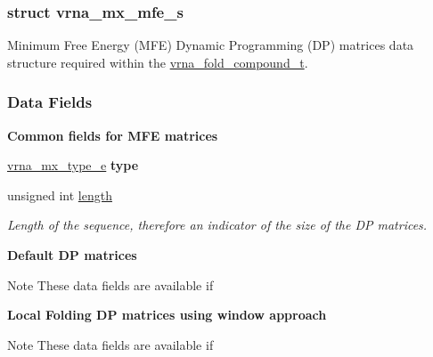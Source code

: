 \subsubsection{struct vrna\+\_\+mx\+\_\+mfe\+\_\+s}
Minimum Free Energy (M\+FE) Dynamic Programming (DP) matrices data structure required within the \mbox{\hyperlink{group__fold__compound_ga1b0cef17fd40466cef5968eaeeff6166}{vrna\+\_\+fold\+\_\+compound\+\_\+t}}. \subsubsection*{Data Fields}
\begin{Indent}\textbf{ Common fields for M\+FE matrices}\par
\begin{DoxyCompactItemize}
\item 
\mbox{\label{group__dp__matrices_a468680aa937b664d453075108d976ae2}} 
\mbox{\hyperlink{group__dp__matrices_ga6042ea1d58d01931e959791be6d89343}{vrna\+\_\+mx\+\_\+type\+\_\+e}} {\bfseries type}
\item 
\mbox{\label{group__dp__matrices_a1f92a8406fc1fb721dbf9193c34ad826}} 
unsigned int \mbox{\hyperlink{group__dp__matrices_a1f92a8406fc1fb721dbf9193c34ad826}{length}}
\begin{DoxyCompactList}\small\item\em Length of the sequence, therefore an indicator of the size of the DP matrices. \end{DoxyCompactList}\end{DoxyCompactItemize}
\end{Indent}
\begin{Indent}\textbf{ Default DP matrices}\par
{\em \begin{DoxyNote}{Note}
These data fields are available if 
\begin{DoxyCode}{0}
\end{DoxyCode}
 
\end{DoxyNote}
}\end{Indent}
\begin{Indent}\textbf{ Local Folding DP matrices using window approach}\par
{\em \begin{DoxyNote}{Note}
These data fields are available if 
\begin{DoxyCode}{0}
\end{DoxyCode}
 
\end{DoxyNote}
}\end{Indent}
